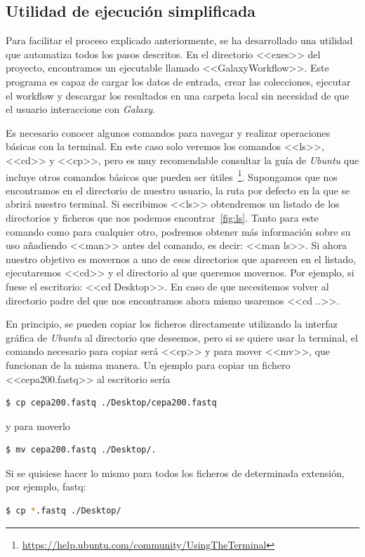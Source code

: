 \subsection{Utilidad de ejecución simplificada}
\label{EjecucionSimplificada}
Para facilitar el proceso explicado anteriormente, se ha desarrollado una utilidad que automatiza todos los pasos descritos. En el directorio <<exes>> del proyecto, encontramos un ejecutable llamado <<GalaxyWorkflow>>. Este programa es capaz de cargar los datos de entrada, crear las colecciones, ejecutar el workflow y descargar los resultados en una carpeta local sin necesidad de que el usuario interaccione con \textit{Galaxy}. 

Es necesario conocer algunos comandos para navegar y realizar operaciones básicas con la terminal. En este caso solo veremos los comandos <<ls>>, <<cd>> y <<cp>>, pero es muy recomendable consultar la guía de \textit{Ubuntu} que incluye otros comandos básicos que pueden ser útiles~\footnote{\url{https://help.ubuntu.com/community/UsingTheTerminal}}. Supongamos que nos encontramos en el directorio de nuestro usuario, la ruta por defecto en la que se abrirá nuestro terminal. Si escribimos <<ls>> obtendremos un listado de los directorios y ficheros que nos podemos encontrar~\ref{fig:ls}. Tanto para este comando como para cualquier otro, podremos obtener más información sobre su uso añadiendo <<man>> antes del comando, es decir: <<man ls>>. Si ahora nuestro objetivo es movernos a uno de esos directorios que aparecen en el listado, ejecutaremos <<cd>> y el directorio al que queremos movernos. Por ejemplo, si fuese el escritorio: <<cd Desktop>>. En caso de que necesitemos volver al directorio padre del que nos encontramos ahora mismo usaremos <<cd ..>>.

En principio, se pueden copiar los ficheros directamente utilizando la interfaz gráfica de \textit{Ubuntu} al directorio que deseemos, pero si se quiere usar la terminal, el comando necesario para copiar será <<cp>> y para mover <<mv>>, que funcionan de la misma manera. Un ejemplo para copiar un fichero <<cepa200.fastq>> al escritorio sería
\begin{lstlisting}[language=bash]
    $ cp cepa200.fastq ./Desktop/cepa200.fastq
\end{lstlisting}
y para moverlo 
\begin{lstlisting}[language=bash]
    $ mv cepa200.fastq ./Desktop/.
\end{lstlisting}
Si se quisiese hacer lo mismo para todos los ficheros de determinada extensión, por ejemplo, fastq: 
\begin{lstlisting}[language=bash]
    $ cp *.fastq ./Desktop/
\end{lstlisting}

